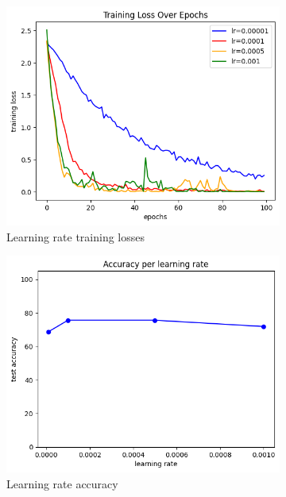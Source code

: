 \begin{figure}
	\centering
	\begin{subfigure}{0.23\linewidth}
		\centering
		\includegraphics[width=\linewidth]{image/q4-7-lr-train.png}
		\caption{Learning rate training losses}
		\label{fig:q4-7-lr-train}
	\end{subfigure}%
	\hfill
	\begin{subfigure}{0.23\linewidth}
		\centering
		\includegraphics[width=\linewidth]{image/q4-7-lr.png}
		\caption{Learning rate accuracy}
		\label{fig:q4-7-lr}
	\end{subfigure}
	\hfill
	\begin{subfigure}{0.23\linewidth}

\end{subfigure}
\end{figure}
